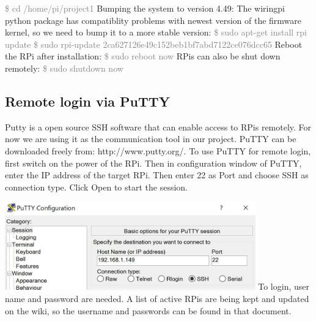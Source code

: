 \documentclass{article}
\begin{document}
\textcolor{gray}{\$ cd /home/pi/project1}\newline\newline
Bumping the system to version 4.49:\newline
The wiringpi python package has compatiblity problems with newest version of the firmware kernel, so we need to bump it to a more stable version:\newline
\textcolor{gray}{\$ sudo apt-get install rpi update}\newline
\textcolor{gray}{\$ sudo rpi-update 2ca627126e49c152beb1bf7abd7122ce076dcc65}\newline
Reboot the RPi after installation:\newline
\textcolor{gray}{\$ sudo reboot now}\newline
RPis can also be shut down remotely:\newline
\textcolor{gray}{\$ sudo shutdown now}\newline
\subsection{Remote login via PuTTY}
Putty is a open source SSH software that can enable access to RPis remotely. For now we are using it as the communication tool in our project. \newline\newline
PuTTY can be downloaded freely from: http://www.putty.org/.\newline\newline
To use PuTTY for remote login, first switch on the power of the RPi. Then in configuration window of PuTTY, enter the IP address of the target RPi. Then enter 22 as Port and choose SSH as connection type. Click Open to start the session.\newline

\includegraphics[height=1.5in]{putty1.JPG}\newline\newline
To login, user name and password are needed. A list of active RPis are being kept and updated on the wiki, so the username and passwords can be found in that document. \newline 
\end{document}
